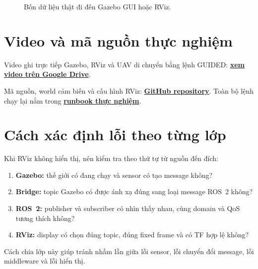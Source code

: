 \documentclass[a4paper]{article}
\begin{document}
\begin{figure}[H]
\caption{Bốn dữ liệu thật đi đến Gazebo GUI hoặc RViz.}
\label{fig:visualizer-packets}
\end{figure}

\section*{Video và mã nguồn thực nghiệm}

Video ghi trực tiếp Gazebo, RViz và UAV di chuyển bằng lệnh GUIDED:
\href{https://drive.google.com/file/d/1D1ceJg4oJFvSS2aUksKp6LQNnHCnOOei/view?usp=sharing}{\textbf{xem video trên Google Drive}}.

Mã nguồn, world cảm biến và cấu hình RViz:
\href{https://github.com/thanhlamauto/ardu_plugin_gazebo}{\textbf{GitHub repository}}. Toàn bộ lệnh chạy lại nằm trong
\href{https://github.com/thanhlamauto/ardu_plugin_gazebo/blob/main/docs/closed_loop_runtime_walkthrough_vi.md}{\textbf{runbook thực nghiệm}}.

\section{Cách xác định lỗi theo từng lớp}

Khi RViz không hiển thị, nên kiểm tra theo thứ tự từ nguồn đến đích:

\begin{enumerate}
  \item \textbf{Gazebo:} thế giới có đang chạy và sensor có tạo message không?
  \item \textbf{Bridge:} topic Gazebo có được ánh xạ đúng sang loại message ROS~2 không?
  \item \textbf{ROS~2:} publisher và subscriber có nhìn thấy nhau, cùng domain và QoS tương thích không?
  \item \textbf{RViz:} display có chọn đúng topic, đúng fixed frame và có TF hợp lệ không?
\end{enumerate}

Cách chia lớp này giúp tránh nhầm lẫn giữa lỗi sensor, lỗi chuyển đổi message, lỗi middleware và lỗi hiển thị.
\end{document}
